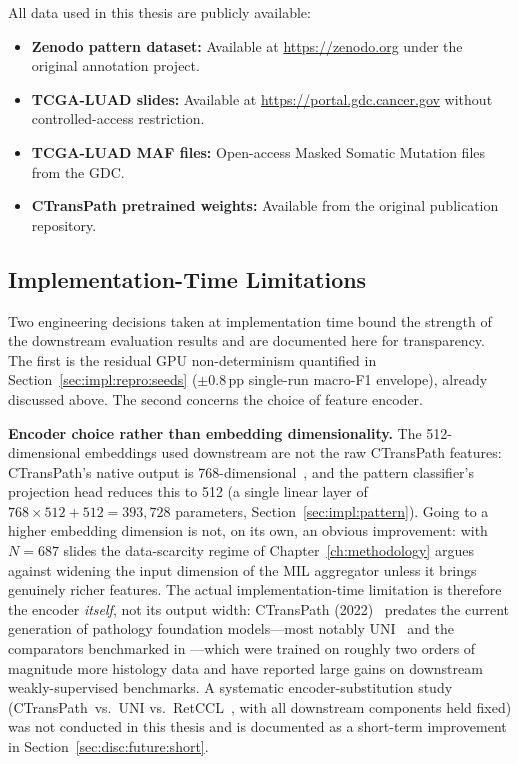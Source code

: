 All data used in this thesis are publicly available:
\begin{itemize}
    \item \textbf{Zenodo pattern dataset:} Available at \url{https://zenodo.org} under the original annotation project.
    \item \textbf{TCGA-LUAD slides:} Available at \url{https://portal.gdc.cancer.gov} without controlled-access restriction.
    \item \textbf{TCGA-LUAD MAF files:} Open-access Masked Somatic Mutation files from the GDC.
    \item \textbf{CTransPath pretrained weights:} Available from the original publication repository.
\end{itemize}

\subsection{Implementation-Time Limitations}
\label{sec:impl:repro:limitations}

Two engineering decisions taken at implementation time bound the
strength of the downstream evaluation results and are documented
here for transparency.
The first is the residual GPU non-determinism quantified in
Section~\ref{sec:impl:repro:seeds} ($\pm 0.8$\,pp single-run
macro-F1 envelope), already discussed above.
The second concerns the choice of feature encoder.

\textbf{Encoder choice rather than embedding dimensionality.}
The 512-dimensional embeddings used downstream are not the raw
CTransPath features: CTransPath's native output is
768-dimensional~\cite{wang2022ctranspath}, and the pattern
classifier's projection head reduces this to 512 (a single linear
layer of $768 \times 512 + 512 = 393{,}728$ parameters,
Section~\ref{sec:impl:pattern}).
Going to a higher embedding dimension is not, on its own, an
obvious improvement: with $N=687$ slides the data-scarcity regime
of Chapter~\ref{ch:methodology} argues against widening the input
dimension of the MIL aggregator unless it brings genuinely richer
features.
The actual implementation-time limitation is therefore the encoder
\emph{itself}, not its output width: CTransPath
(2022)~\cite{wang2022ctranspath} predates the current generation
of pathology foundation models---most notably
UNI~\cite{chen2024uni} and the comparators benchmarked in
\cite{foundationbenchmark2025natcomm}---which were trained on
roughly two orders of magnitude more histology data and have
reported large gains on downstream weakly-supervised
benchmarks.
A systematic encoder-substitution study (CTransPath~vs.\ UNI vs.\
RetCCL~\cite{wang2023retccl}, with all downstream components held
fixed) was not conducted in this thesis and is documented as a
short-term improvement in
Section~\ref{sec:disc:future:short}.

